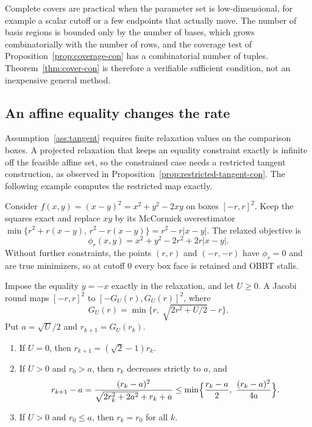 Complete covers are practical when the parameter set is low-dimensional,
for example a scalar cutoff or a few endpoints that actually move. The
number of basis regions is bounded only by the number of bases, which grows
combinatorially with the number of rows, and the coverage test of
Proposition~\ref{prop:coverage-con} has a combinatorial number of tuples.
Theorem~\ref{thm:cover-con} is therefore a verifiable sufficient condition,
not an inexpensive general method.

\subsection{An affine equality changes the rate}\label{sec:equality-con}

Assumption~\ref{ass:tangent} requires finite relaxation values on the
comparison boxes. A projected relaxation that keeps an equality constraint
exactly is infinite off the feasible affine set, so the constrained case
needs a restricted tangent construction, as observed in
Proposition~\ref{prop:restricted-tangent-con}. The following example
computes the restricted map exactly.

Consider $f(x,y)=(x-y)^2=x^2+y^2-2xy$ on boxes $[-r,r]^2$. Keep the squares
exact and replace $xy$ by its McCormick overestimator
$\min\{r^2+r(x-y),\,r^2-r(x-y)\}=r^2-r|x-y|$. The relaxed objective is
\[
 \phi_r(x,y)=x^2+y^2-2r^2+2r|x-y|.
\]
Without further constraints, the points $(r,r)$ and $(-r,-r)$ have
$\phi_r=0$ and are true minimizers, so at cutoff $0$ every box face is
retained and OBBT stalls.

\begin{proposition}\label{prop:equality-con}
Impose the equality $y=-x$ exactly in the relaxation, and let $U\ge0$.
A Jacobi round maps $[-r,r]^2$ to $[-G_U(r),G_U(r)]^2$, where
\[
 G_U(r)=\min\bigl\{r,\ \sqrt{2r^2+U/2}-r\bigr\}.
\]
Put $a=\sqrt U/2$ and $r_{k+1}=G_U(r_k)$.
\begin{enumerate}
\item[(a)] If $U=0$, then $r_{k+1}=(\sqrt2-1)r_k$.
\item[(b)] If $U>0$ and $r_0>a$, then $r_k$ decreases strictly to $a$, and
 \[
  r_{k+1}-a=\frac{(r_k-a)^2}{\sqrt{2r_k^2+2a^2}+r_k+a}
  \le\min\Bigl\{\frac{r_k-a}{2},\ \frac{(r_k-a)^2}{4a}\Bigr\}.
 \]
\item[(c)] If $U>0$ and $r_0\le a$, then $r_k=r_0$ for all $k$.
\end{enumerate}
\end{proposition}

